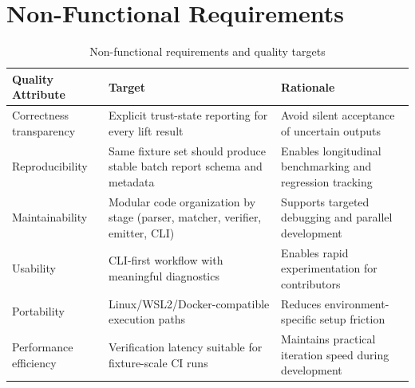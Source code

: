 \section{Non-Functional Requirements}
\begin{table}[H]
\centering
\caption{Non-functional requirements and quality targets}
\begin{tabular}{|p{3.5cm}|p{4.0cm}|p{7.0cm}|}
\hline
\textbf{Quality Attribute} & \textbf{Target} & \textbf{Rationale} \\
\hline
Correctness transparency & Explicit trust-state reporting for every lift result & Avoid silent acceptance of uncertain outputs \\
\hline
Reproducibility & Same fixture set should produce stable batch report schema and metadata & Enables longitudinal benchmarking and regression tracking \\
\hline
Maintainability & Modular code organization by stage (parser, matcher, verifier, emitter, CLI) & Supports targeted debugging and parallel development \\
\hline
Usability & CLI-first workflow with meaningful diagnostics & Enables rapid experimentation for contributors \\
\hline
Portability & Linux/WSL2/Docker-compatible execution paths & Reduces environment-specific setup friction \\
\hline
Performance efficiency & Verification latency suitable for fixture-scale CI runs & Maintains practical iteration speed during development \\
\hline
\end{tabular}
\end{table}
